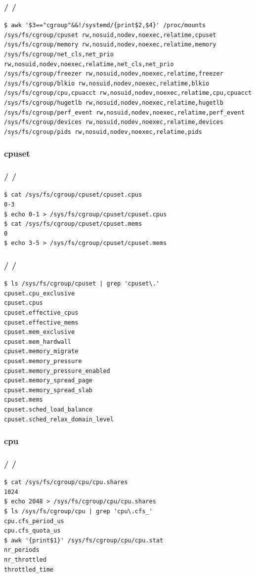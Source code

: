 \documentclass{beamer}
\newcommand{\autotitle}
{\frametitle{
    \secname
    \ifx\insertsubsection\empty
    \else
        /\subsecname
        \ifx\insertsubsubsection\empty\else/\subsubsecname\fi
    \fi}}
\begin{document}
\begin{frame}[fragile]
    \autotitle
    \scriptsize
    \begin{verbatim}
$ awk '$3=="cgroup"&&!/systemd/{print$2,$4}' /proc/mounts
/sys/fs/cgroup/cpuset rw,nosuid,nodev,noexec,relatime,cpuset
/sys/fs/cgroup/memory rw,nosuid,nodev,noexec,relatime,memory
/sys/fs/cgroup/net_cls,net_prio rw,nosuid,nodev,noexec,relatime,net_cls,net_prio
/sys/fs/cgroup/freezer rw,nosuid,nodev,noexec,relatime,freezer
/sys/fs/cgroup/blkio rw,nosuid,nodev,noexec,relatime,blkio
/sys/fs/cgroup/cpu,cpuacct rw,nosuid,nodev,noexec,relatime,cpu,cpuacct
/sys/fs/cgroup/hugetlb rw,nosuid,nodev,noexec,relatime,hugetlb
/sys/fs/cgroup/perf_event rw,nosuid,nodev,noexec,relatime,perf_event
/sys/fs/cgroup/devices rw,nosuid,nodev,noexec,relatime,devices
/sys/fs/cgroup/pids rw,nosuid,nodev,noexec,relatime,pids
    \end{verbatim}
\end{frame}

\subsubsection{cpuset}

\begin{frame}[fragile]
    \autotitle
    \begin{verbatim}
$ cat /sys/fs/cgroup/cpuset/cpuset.cpus
0-3
$ echo 0-1 > /sys/fs/cgroup/cpuset/cpuset.cpus
$ cat /sys/fs/cgroup/cpuset/cpuset.mems
0
$ echo 3-5 > /sys/fs/cgroup/cpuset/cpuset.mems
    \end{verbatim}
\end{frame}

\begin{frame}[fragile]
    \autotitle
    \begin{verbatim}
$ ls /sys/fs/cgroup/cpuset | grep 'cpuset\.'
cpuset.cpu_exclusive
cpuset.cpus
cpuset.effective_cpus
cpuset.effective_mems
cpuset.mem_exclusive
cpuset.mem_hardwall
cpuset.memory_migrate
cpuset.memory_pressure
cpuset.memory_pressure_enabled
cpuset.memory_spread_page
cpuset.memory_spread_slab
cpuset.mems
cpuset.sched_load_balance
cpuset.sched_relax_domain_level
    \end{verbatim}
\end{frame}

\subsubsection{cpu}

\begin{frame}[fragile]
    \autotitle
    \begin{verbatim}
$ cat /sys/fs/cgroup/cpu/cpu.shares
1024
$ echo 2048 > /sys/fs/cgroup/cpu/cpu.shares
$ ls /sys/fs/cgroup/cpu | grep 'cpu\.cfs_'
cpu.cfs_period_us
cpu.cfs_quota_us
$ awk '{print$1}' /sys/fs/cgroup/cpu/cpu.stat
nr_periods
nr_throttled
throttled_time
    \end{verbatim}
\end{frame}
\end{document}

